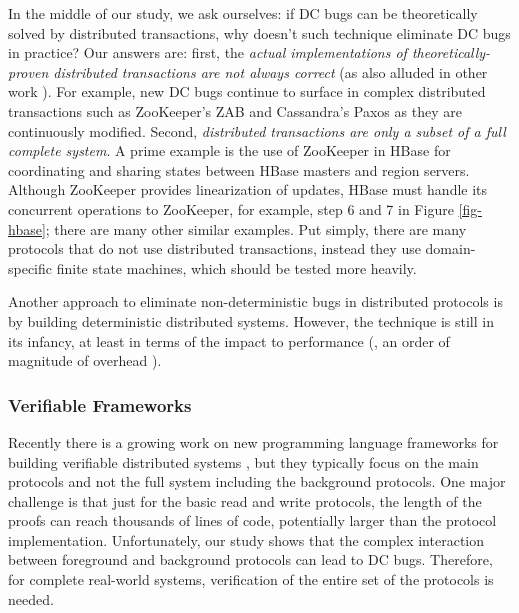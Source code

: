In the middle of our study, we ask ourselves: if DC bugs can be
theoretically solved by distributed transactions, why doesn't such
technique eliminate DC bugs in practice?  Our answers are:
%
first, the {\em actual implementations of theoretically-proven
  distributed transactions are not always correct}
(as also alluded in other work \cite{Burrows06-Chubby, Ongaro+14-Raft}).
For example, new
DC bugs continue to surface in complex distributed transactions such
as ZooKeeper's ZAB and Cassandra's Paxos as they are continuously
modified.
%
Second, {\em distributed transactions are only a subset of a full
  complete system}.  A prime example is the use of ZooKeeper in HBase
for coordinating and sharing states between HBase masters and region
servers.  Although ZooKeeper provides linearization of updates, HBase
must handle its concurrent operations to ZooKeeper,
for example, step 6 and 7 in Figure \ref{fig-hbase};
there are many other similar examples.%
%
Put simply, there are many protocols that do not use distributed
transactions, instead they use domain-specific finite state machines,
which should be tested more heavily.

Another approach to eliminate non-deterministic bugs in distributed
protocols is by building deterministic distributed systems.  However, the
technique is still in its infancy, at least in terms of the impact to
performance (\eg, an order of magnitude of overhead \cite{Hunt+13-DDOS}).


\subsubsection{Verifiable Frameworks}
\label{less-others}

Recently there is a growing work on new programming language frameworks
for building verifiable distributed systems \cite{Desai+13-PLang,
Hawblitzel+15-IronFleet, Wilcox+15-Verdi}, but they typically focus on the
main protocols  and not the full system including
the background protocols.  One major challenge is that 
just for the basic read and write protocols,
the length of the
proofs can reach thousands of lines of code, potentially
larger than the protocol implementation.
Unfortunately, our study shows that the complex
interaction between foreground and background protocols can lead to DC
bugs.  Therefore, for complete real-world systems, verification of the
entire set of the protocols is needed.

